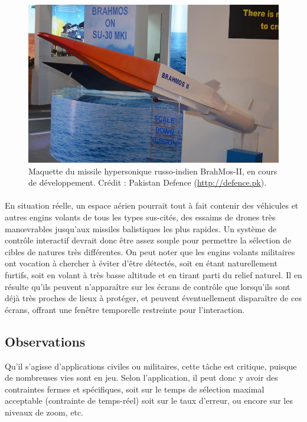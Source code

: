 	\begin{figure}[htb]
		\centering
		\includegraphics[width=\textwidth]{figures/brahmos-II}
		\caption{Maquette du missile hypersonique russo-indien BrahMos-II, en cours de développement. Crédit : Pakistan Defence (\url{http://defence.pk}).}
		\label{fig:brahmos}
	\end{figure}
	
	\paragraph{}
	En situation réelle, un espace aérien pourrait tout à fait contenir des véhicules et autres engins volants de tous les types sus-cités, des essaims de drones très manœvrables jusqu'aux missiles balistiques les plus rapides. Un système de contrôle interactif devrait donc être assez souple pour permettre la sélection de cibles de natures très différentes.
	On peut noter que les engins volants militaires ont vocation à chercher à éviter d'être détectés, soit en étant naturellement furtifs, soit en volant à très basse altitude et en tirant parti du relief naturel. Il en résulte qu'ils peuvent n'apparaître sur les écrans de contrôle que lorsqu'ils sont déjà très proches de lieux à protéger, et peuvent éventuellement disparaître de ces écrans, offrant une fenêtre temporelle restreinte pour l'interaction.
	
	\subsection{Observations}
	Qu'il s'agisse d'applications civiles ou militaires, cette tâche est critique, puisque de nombreuses vies sont en jeu. Selon l'application, il peut donc y avoir des contraintes fermes et spécifiques, soit sur le temps de sélection maximal acceptable (contrainte de temps-réel) soit sur le taux d'erreur, ou encore sur les niveaux de zoom, etc.

